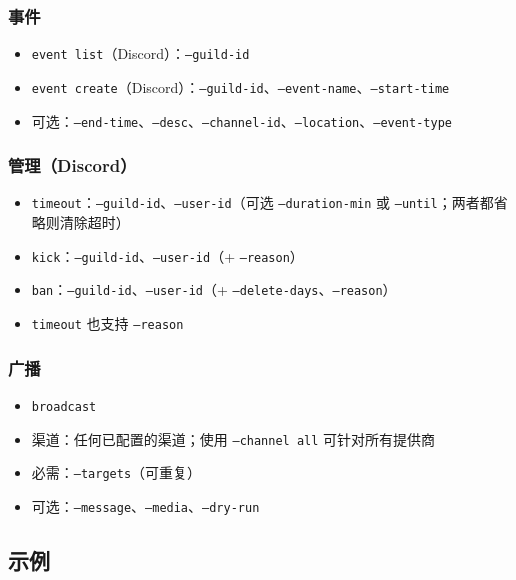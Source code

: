 \subsubsection{事件}


\begin{itemize}
  \item \texttt{event list}（Discord）：\texttt{--guild-id}
  \item \texttt{event create}（Discord）：\texttt{--guild-id}、\texttt{--event-name}、\texttt{--start-time}
  \item 可选：\texttt{--end-time}、\texttt{--desc}、\texttt{--channel-id}、\texttt{--location}、\texttt{--event-type}
\end{itemize}


\subsubsection{管理（Discord）}


\begin{itemize}
  \item \texttt{timeout}：\texttt{--guild-id}、\texttt{--user-id}（可选 \texttt{--duration-min} 或 \texttt{--until}；两者都省略则清除超时）
  \item \texttt{kick}：\texttt{--guild-id}、\texttt{--user-id}（+ \texttt{--reason}）
  \item \texttt{ban}：\texttt{--guild-id}、\texttt{--user-id}（+ \texttt{--delete-days}、\texttt{--reason}）
  \item \texttt{timeout} 也支持 \texttt{--reason}
\end{itemize}


\subsubsection{广播}


\begin{itemize}
  \item \texttt{broadcast}
  \item 渠道：任何已配置的渠道；使用 \texttt{--channel all} 可针对所有提供商
  \item 必需：\texttt{--targets}（可重复）
  \item 可选：\texttt{--message}、\texttt{--media}、\texttt{--dry-run}
\end{itemize}


\subsection{示例}



